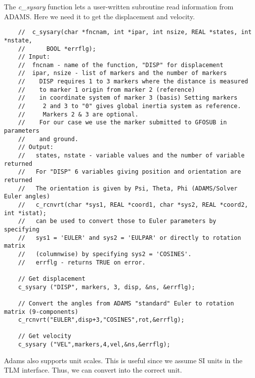 The {\em c\_sysary} function lets a user-written subroutine read information from ADAMS. 
Here we need it to get the displacement and velocity.

{
\scriptsize
\begin{verbatim}
    //  c_sysary(char *fncnam, int *ipar, int nsize, REAL *states, int *nstate,
    //      BOOL *errflg);
    // Input:
    //  fncnam - name of the function, "DISP" for displacement
    //  ipar, nsize - list of markers and the number of markers
    //    DISP requires 1 to 3 markers where the distance is measured
    //    to marker 1 origin from marker 2 (reference)
    //    in coordinate system of marker 3 (basis) Setting markers
    //     2 and 3 to "0" gives global inertia system as reference.
    //     Markers 2 & 3 are optional.
    //    For our case we use the marker submitted to GFOSUB in parameters
    //    and ground.
    // Output:
    //   states, nstate - variable values and the number of variable returned
    //   For "DISP" 6 variables giving position and orientation are returned
    //   The orientation is given by Psi, Theta, Phi (ADAMS/Solver Euler angles)
    //   c_rcnvrt(char *sys1, REAL *coord1, char *sys2, REAL *coord2, int *istat);
    //   can be used to convert those to Euler parameters by specifying
    //   sys1 = 'EULER' and sys2 = 'EULPAR' or directly to rotation matrix
    //   (columnwise) by specifying sys2 = 'COSINES'.
    //   errflg - returns TRUE on error.

    // Get displacement
    c_sysary ("DISP", markers, 3, disp, &ns, &errflg);

    // Convert the angles from ADAMS "standard" Euler to rotation matrix (9-components)
    c_rcnvrt("EULER",disp+3,"COSINES",rot,&errflg);

    // Get velocity
    c_sysary ("VEL",markers,4,vel,&ns,&errflg);
\end{verbatim}
}

Adams also supports unit scales. 
This is useful since we assume SI units in the TLM interface. 
Thus, we can convert into the correct unit.

